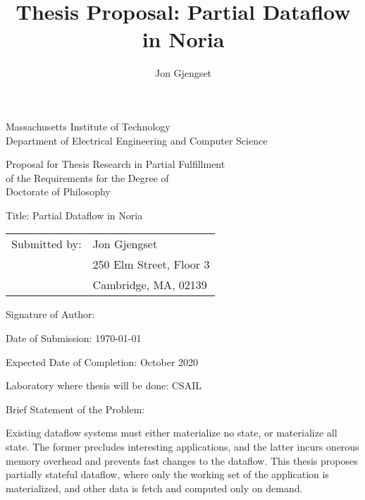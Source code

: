 \documentclass[fontsize=12pt,paper=letter]{scrartcl}
\title{Thesis Proposal: Partial Dataflow in Noria}
\author{Jon Gjengset}
\begin{document}
\begin{spacing}{1}
  \begin{titlepage}
    \begin{center}
      Massachusetts Institute of Technology\\
      Department of Electrical Engineering and Computer Science%
    \end{center}

    \begin{center}
      Proposal for Thesis Research in Partial Fulfillment\\
      of the Requirements for the Degree of\\
      Doctorate of Philosophy%
    \end{center}

    \begin{flushleft}
    Title: Partial Dataflow in Noria

    \vspace{\baselineskip}
    \begin{tabular}{@{}ll}
      Submitted by: & Jon Gjengset\\
      &250 Elm Street, Floor 3\\
      &Cambridge, MA, 02139\\
    \end{tabular}

    \vspace{\baselineskip}
    \vspace{\baselineskip}
    Signature of Author: 

    \vspace{\baselineskip}
    Date of Submission: \today

    \vspace{\baselineskip}
    Expected Date of Completion: October 2020

    \vspace{\baselineskip}
    Laboratory where thesis will be done: CSAIL

    \vspace{\baselineskip}
    Brief Statement of the Problem:
    \end{flushleft}

    \noindent
    Existing dataflow systems must either materialize no state, or materialize
    all state. The former precludes interesting applications, and the latter
    incurs onerous memory overhead and prevents fast changes to the dataflow.
    This thesis proposes partially stateful dataflow, where only the working set
    of the application is materialized, and other data is fetch and computed
    only on demand.
  \end{titlepage}
\end{spacing}
\end{document}
